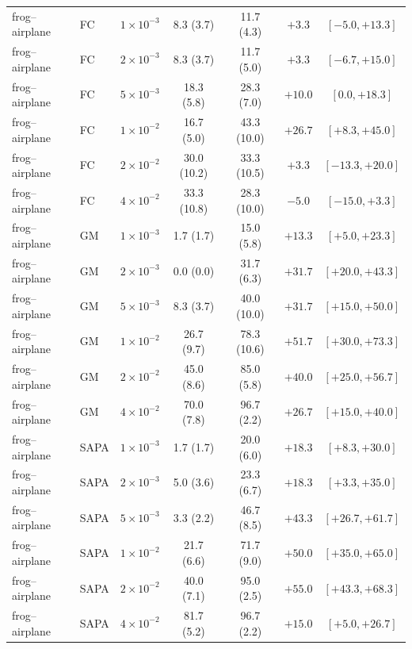 \begin{table}[p]
\begin{tabular}{llccccc}
\midrule

frog--airplane & FC & $1{\times}10^{-3}$ & 8.3 (3.7) & 11.7 (4.3) & $+3.3$ & $[-5.0, +13.3]$ \\
frog--airplane & FC & $2{\times}10^{-3}$ & 8.3 (3.7) & 11.7 (5.0) & $+3.3$ & $[-6.7, +15.0]$ \\
frog--airplane & FC & $5{\times}10^{-3}$ & 18.3 (5.8) & 28.3 (7.0) & $+10.0$ & $[0.0, +18.3]$ \\
frog--airplane & FC & $1{\times}10^{-2}$ & 16.7 (5.0) & 43.3 (10.0) & $+26.7$ & $[+8.3, +45.0]$ \\
frog--airplane & FC & $2{\times}10^{-2}$ & 30.0 (10.2) & 33.3 (10.5) & $+3.3$ & $[-13.3, +20.0]$ \\
frog--airplane & FC & $4{\times}10^{-2}$ & 33.3 (10.8) & 28.3 (10.0) & $-5.0$ & $[-15.0, +3.3]$ \\
\addlinespace[2pt]

frog--airplane & GM & $1{\times}10^{-3}$ & 1.7 (1.7) & 15.0 (5.8) & $+13.3$ & $[+5.0, +23.3]$ \\
frog--airplane & GM & $2{\times}10^{-3}$ & 0.0 (0.0) & 31.7 (6.3) & $+31.7$ & $[+20.0, +43.3]$ \\
frog--airplane & GM & $5{\times}10^{-3}$ & 8.3 (3.7) & 40.0 (10.0) & $+31.7$ & $[+15.0, +50.0]$ \\
frog--airplane & GM & $1{\times}10^{-2}$ & 26.7 (9.7) & 78.3 (10.6) & $+51.7$ & $[+30.0, +73.3]$ \\
frog--airplane & GM & $2{\times}10^{-2}$ & 45.0 (8.6) & 85.0 (5.8) & $+40.0$ & $[+25.0, +56.7]$ \\
frog--airplane & GM & $4{\times}10^{-2}$ & 70.0 (7.8) & 96.7 (2.2) & $+26.7$ & $[+15.0, +40.0]$ \\
\addlinespace[2pt]

frog--airplane & SAPA & $1{\times}10^{-3}$ & 1.7 (1.7) & 20.0 (6.0) & $+18.3$ & $[+8.3, +30.0]$ \\
frog--airplane & SAPA & $2{\times}10^{-3}$ & 5.0 (3.6) & 23.3 (6.7) & $+18.3$ & $[+3.3, +35.0]$ \\
frog--airplane & SAPA & $5{\times}10^{-3}$ & 3.3 (2.2) & 46.7 (8.5) & $+43.3$ & $[+26.7, +61.7]$ \\
frog--airplane & SAPA & $1{\times}10^{-2}$ & 21.7 (6.6) & 71.7 (9.0) & $+50.0$ & $[+35.0, +65.0]$ \\
frog--airplane & SAPA & $2{\times}10^{-2}$ & 40.0 (7.1) & 95.0 (2.5) & $+55.0$ & $[+43.3, +68.3]$ \\
frog--airplane & SAPA & $4{\times}10^{-2}$ & 81.7 (5.2) & 96.7 (2.2) & $+15.0$ & $[+5.0, +26.7]$ \\

\bottomrule
\end{tabular}
\end{table}



